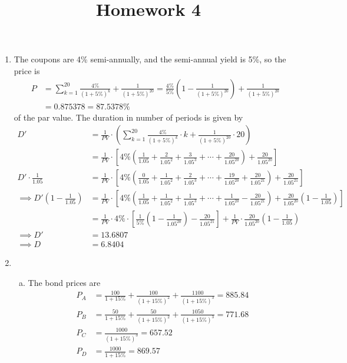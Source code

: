 \documentclass{article}
\begin{document}
\title{Homework 4}
\maketitle
\thispagestyle{fancy}

\begin{enumerate}
	\item 
		\begin{soln}
			The coupons are 4\% semi-annually, and the semi-annual yield is 5\%, so the price is
			\begin{align*}
				P &= \sum_{k=1}^{20} \frac{4\%}{(1+5\%)^k} + \frac{1}{(1+5\%)^{20}} = \frac{4\%}{5\%}\left( 1-\frac{1}{(1+5\%)^{20}} \right) + \frac{1}{(1+5\%)^{20}} \\
				&= 0.875378 = 87.5378\%
			\end{align*}
			of the par value. The duration in number of periods is given by
			\begin{align*}
				D' &= \frac{1}{PV}\cdot \left(\sum_{k=1}^{20} \frac{4\%}{(1+5\%)^k}\cdot k + \frac{1}{(1+5\%)^{20}}\cdot 20\right) \\
				&= \frac{1}{PV}\cdot \left[4\%\left( \frac{1}{1.05} + \frac{2}{1.05^2} + \frac{3}{1.05^3} + \cdots + \frac{20}{1.05^{20}} \right) + \frac{20}{1.05^{20}} \right] \\
				D'\cdot \frac{1}{1.05} &= \frac{1}{PV}\cdot\left[4\%\left( \frac{0}{1.05} + \frac{1}{1.05^2} + \frac{2}{1.05^3} + \cdots + \frac{19}{1.05^{20}} + \frac{20}{1.05^{21}} \right) + \frac{20}{1.05^{21}} \right] \\
				\implies D'\left( 1-\frac{1}{1.05} \right) &= \frac{1}{PV}\cdot \left[4\%\left( \frac{1}{1.05} + \frac{1}{1.05^2} + \frac{1}{1.05^3} + \cdots + \frac{1}{1.05^{20}} - \frac{20}{1.05^{21}} \right) + \frac{20}{1.05^{20}}\left( 1-\frac{1}{1.05} \right) \right] \\
				&= \frac{1}{PV}\cdot 4\%\cdot \left[\frac{1}{5\%}\left( 1-\frac{1}{1.05^{20}} \right) - \frac{20}{1.05^{21}} \right] + \frac{1}{PV} \cdot \frac{20}{1.05^{20}}\left( 1-\frac{1}{1.05} \right) \\
				\implies D' &= 13.6807 \\
				\implies D &= 6.8404
			\end{align*}
		\end{soln}

	\item 
		\begin{enumerate}[(a)]
			\item 
				\begin{soln}
					The bond prices are
					\begin{align*}
						P_A &= \frac{100}{1+15\%} + \frac{100}{(1+15\%)^2} + \frac{1100}{(1+15\%)^3} = 885.84 \\
						P_B &= \frac{50}{1+15\%} + \frac{50}{(1+15\%)^2} + \frac{1050}{(1+15\%)^3} = 771.68 \\
						P_C&= \frac{1000}{(1+15\%)^3} = 657.52 \\
						P_D &= \frac{1000}{1+15\%} = 869.57
					\end{align*}
				\end{soln}


\end{enumerate}
\end{enumerate}
\end{document}
